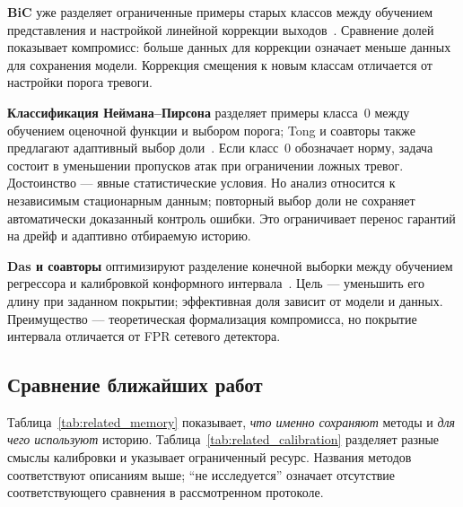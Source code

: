 \textbf{BiC} уже разделяет ограниченные примеры старых классов
между обучением представления и настройкой линейной коррекции
выходов~\cite{BiC2019}. Сравнение долей показывает компромисс:
больше данных для коррекции означает меньше данных для сохранения
модели. Коррекция смещения к новым классам отличается от настройки
порога тревоги.

\textbf{Классификация Неймана--Пирсона} разделяет примеры класса~0
между обучением оценочной функции и выбором порога; Tong
и соавторы также предлагают адаптивный выбор доли~\cite{NP2020}.
Если класс~0 обозначает норму, задача состоит в уменьшении
пропусков атак при ограничении ложных тревог. Достоинство ---
явные статистические условия. Но анализ относится к независимым
стационарным данным; повторный выбор доли не сохраняет
автоматически доказанный контроль ошибки. Это ограничивает
перенос гарантий на дрейф и адаптивно отбираемую историю.

\textbf{Das и соавторы} оптимизируют разделение конечной выборки
между обучением регрессора и калибровкой конформного
интервала~\cite{OptimalSplit2026}. Цель --- уменьшить его длину
при заданном покрытии; эффективная доля зависит от модели
и данных. Преимущество --- теоретическая формализация компромисса,
но покрытие интервала отличается от FPR сетевого детектора.

\subsection{Сравнение ближайших работ}
\label{subsec:related_comparison}

Таблица~\ref{tab:related_memory} показывает, \emph{что именно
сохраняют} методы и \emph{для чего используют} историю.
Таблица~\ref{tab:related_calibration} разделяет разные смыслы
калибровки и указывает ограниченный ресурс. Названия методов
соответствуют описаниям выше; \enquote{не исследуется} означает
отсутствие соответствующего сравнения в рассмотренном протоколе.

